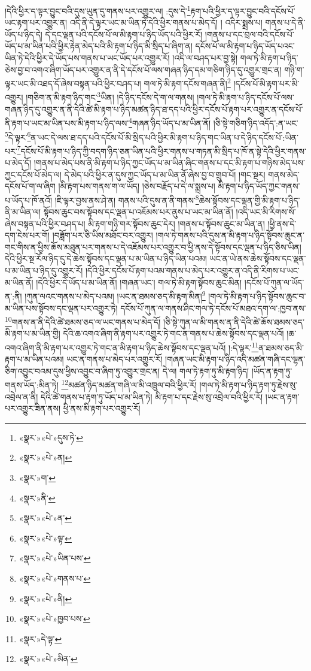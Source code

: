 །དེའི་ཕྱིར་ད་ལྟར་བྱུང་བའི་དུས་ཡུན་དུ་གནས་པར་འགྱུར་ལ། :དུས་དེ་\footnote{«སྣར་»«པེ་»དུས་ཏེ་}རྟག་པའི་ཕྱིར་ད་ལྟར་བྱུང་བའི་དངོས་པོ་ཡང་རྟག་པར་འགྱུར་ན། འདི་ནི་དེ་ལྟར་ཡང་མ་ཡིན་ཏེ་དེའི་ཕྱིར་གནས་པ་མེད་དོ། །
འདིར་སྨྲས་པ། གནས་པ་དེ་ནི་ཡོད་པ་ཉིད་དེ། དེ་དང་ལྡན་པའི་དངོས་པོ་ལ་མི་རྟག་པ་ཉིད་ཡོད་པའི་ཕྱིར་རོ། །གནས་པ་དང་བྲལ་བའི་དངོས་པོ་ཡོད་པ་མ་ཡིན་པའི་ཕྱིར་རྟེན་མེད་པའི་མི་རྟག་པ་ཉིད་མི་སྲིད་པ་ཞིག་ན། དངོས་པོ་ལ་མི་རྟག་པ་ཉིད་ཡོད་པའང་ཡིན་ཏེ་དེའི་ཕྱིར་དེ་ཡོད་པས་གནས་པ་ཡང་ཡོད་པར་འགྱུར་རོ། །འདི་ལ་བཤད་པར་བྱ་སྟེ། གལ་ཏེ་མི་རྟག་པ་ཉིད་ཅེས་བྱ་བ་འགའ་ཞིག་ཡོད་པར་འགྱུར་ན་ནི་དེ་དངོས་པོ་ལས་གཞན་ཉིད་དམ་གཅིག་ཉིད་དུ་འགྱུར་གྲང་ན། གཉི་ག་ལྟར་ཡང་མི་འཐད་དོ་ཞེས་བསྟན་པའི་ཕྱིར་བཤད་པ། གལ་ཏེ་མི་རྟག་དངོས་གཞན་ནི།\footnote{«སྣར་»«པེ་»ན།} །དངོས་པོ་མི་རྟག་པར་མི་འགྱུར། །གཅིག་ན་མི་རྟག་ཉིད་གང་\footnote{«སྣར་»ག་}ཡིན། །དེ་ཉིད་དངོས་དེ་ག་ལ་གནས། །གལ་ཏེ་མི་རྟག་པ་ཉིད་དངོས་པོ་ལས་གཞན་ཉིད་དུ་འགྱུར་ན་ནི་དེའི་ཚེ་མི་རྟག་པ་ཉིད་མཚན་ཉིད་ཐ་དད་པའི་ཕྱིར་དངོས་པོ་རྟག་པར་འགྱུར་ན་དངོས་པོ་ནི་རྟག་པ་ཡང་མ་ཡིན་པས་མི་རྟག་པ་ཉིད་ལས་\footnote{«སྣར་»ནི་}གཞན་ཉིད་ཡོད་པ་མ་ཡིན་ནོ། །ཅི་སྟེ་གཅིག་ཉིད་འདོད་:ན་ཡང་\footnote{«སྣར་»«པེ་»ན་}དེ་ལྟར་\footnote{«སྣར་»«པེ་»ལྟ་}ན་ཡང་དེ་ལས་ཐ་དད་པའི་དངོས་པོ་མི་སྲིད་པའི་ཕྱིར་མི་རྟག་པ་ཉིད་གང་ཡིན་པ་དེ་ཉིད་དངོས་པོ་:ཡིན་པར་\footnote{«སྣར་»«པེ་»ཡིན་པས་}དངོས་པོ་མི་རྟག་པ་ཉིད་ཀྱི་བདག་ཉིད་ཅན་ཡིན་པའི་ཕྱིར་གནས་པ་གཏན་མི་སྲིད་པ་ཁོ་ན་སྟེ་དེའི་ཕྱིར་གནས་པ་མེད་དོ། །གནས་པ་མེད་པས་ནི་མི་རྟག་པ་ཉིད་ཀྱང་ཡོད་པ་མ་ཡིན་ཞིང་གནས་པ་དང་མི་རྟག་པ་གཉིས་མེད་པས་ཀྱང་དངོས་པོ་མེད་ལ། དེ་མེད་པའི་ཕྱིར་ན་དུས་ཀྱང་ཡོད་པ་མ་ཡིན་ནོ་ཞེས་བྱ་བ་གྲུབ་པོ། །གང་སྔར། གནས་མེད་དངོས་པོ་ག་ལ་ཞིག །མི་རྟག་པས་གནས་ག་ལ་ཡོད། །ཅེས་བརྗོད་པ་དེ་ལ་སྨྲས་པ། མི་རྟག་པ་ཉིད་ཡོད་ཀྱང་གནས་པ་ཡོད་པ་ཁོ་ནའོ། །ཇི་ལྟར་བྱས་ནས་ཤེ་ན། གནས་པའི་དུས་ན་ནི་གནས་\footnote{«སྣར་»«པེ་»གནས་པ་}ཆེས་སྟོབས་དང་ལྡན་གྱི་མི་རྟག་པ་ཉིད་ནི་མ་ཡིན་ལ། སྟོབས་ཆུང་བས་སྟོབས་དང་ལྡན་པ་འཇོམས་པར་ནུས་པ་ཡང་མ་ཡིན་ནོ། །འདི་ཡང་མི་རིགས་སོ་ཞེས་བསྟན་པའི་ཕྱིར་བཤད་པ། མི་རྟག་གཉི་གར་སྟོབས་ཆུང་དེར། །གནས་པ་སྟོབས་ཆུང་མ་ཡིན་ན། །ཕྱི་ནས་དེ་དག་ངེས་པར་གོ། །བཟློག་པར་ཅི་ཡིས་མཐོང་བར་འགྱུར། །གལ་ཏེ་གནས་པའི་དུས་ན་མི་རྟག་པ་ཉིད་སྟོབས་ཆུང་ན་གང་གིས་ན་ཕྱིས་ཆོས་མཐུན་པར་གནས་པ་དེ་འཇོམས་པར་འགྱུར་བ་ཕྱི་ནས་དེ་སྟོབས་དང་ལྡན་པ་ཉིད་ཅིས་ཡིན། དེའི་ཕྱིར་སྔ་རོལ་ཉིད་དུ་དེ་ཆེས་སྟོབས་དང་ལྡན་པ་མ་ཡིན་པ་ཉིད་ཡིན་པའམ། ཡང་ན་ཡེ་ནས་ཆེས་སྟོབས་དང་ལྡན་པ་མ་ཡིན་པ་ཉིད་དུ་འགྱུར་རོ། །དེའི་ཕྱིར་དངོས་པོ་རྟག་པའམ་གནས་པ་མེད་པར་འགྱུར་ན་འདི་ནི་རིགས་པ་ཡང་མ་ཡིན་ནོ། །དེའི་ཕྱིར་དེ་ཡོད་པ་མ་ཡིན་ནོ། །གཞན་ཡང་། གལ་ཏེ་མི་རྟག་སྟོབས་ཆུང་མིན། །དངོས་པོ་ཀུན་ལ་ཡོད་ན་:ནི། །ཀུན་ལའང་གནས་པ་མེད་པའམ། །ཡང་ན་ཐམས་ཅད་མི་རྟག་མིན།\footnote{«སྣར་»«པེ་»ནི།} །གལ་ཏེ་མི་རྟག་པ་ཉིད་སྟོབས་ཆུང་བ་མ་ཡིན་པས་སྟོབས་དང་ལྡན་པར་འགྱུར་ཏེ། དངོས་པོ་ཀུན་ལ་གནས་ཤིང་གལ་ཏེ་དངོས་པོ་མཐའ་དག་ལ་:ཁྱབ་ནས་\footnote{«སྣར་»«པེ་»ཁྱབ་པས་}གནས་ན་ནི་དེའི་ཚེ་ཐམས་ཅད་ལ་ཡང་གནས་པ་མེད་དོ། །ཅི་སྟེ་ཀུན་ལ་མི་གནས་ན་ནི་དེའི་ཚེ་ཆོས་ཐམས་ཅད་མི་རྟག་པ་མ་ཡིན་གྱི། དེའི་ཆ་འགའ་ཞིག་ནི་རྟག་པར་འགྱུར་ཏེ་གང་ན་གནས་པ་ཆེས་སྟོབས་དང་ལྡན་པའོ། །ཆ་འགའ་ཞིག་ནི་མི་རྟག་པར་འགྱུར་ཏེ་གང་ན་མི་རྟག་པ་ཉིད་ཆེས་སྟོབས་དང་ལྡན་པའོ། །:དེ་ལྟར་\footnote{«སྣར་»དེ་ལྟ་}ན་ཐམས་ཅད་མི་རྟག་པ་མ་ཡིན་པའམ། ཡང་ན་གནས་པ་མེད་པར་འགྱུར་རོ། །གཞན་ཡང་མི་རྟག་པ་ཉིད་འདི་མཚན་གཞི་དང་ལྷན་ཅིག་འབྱུང་བའམ་དུས་ཕྱིས་འབྱུང་བ་ཞིག་ཏུ་འགྱུར་གྲང་ན། དེ་ལ། གལ་ཏེ་རྟག་ཏུ་མི་རྟག་ཉིད། །ཡོད་ན་རྟག་ཏུ་གནས་ཡོད་:མིན་ཏེ། \footnote{«སྣར་»«པེ་»མིན་}མཚན་ཉིད་མཚན་གཞི་ལ་མི་འཁྲུལ་བའི་ཕྱིར་རོ། །གལ་ཏེ་མི་རྟག་པ་ཉིད་རྟག་ཏུ་རྗེས་སུ་འབྲེལ་ན་ནི། དེའི་ཚེ་གནས་པ་རྟག་ཏུ་ཡོད་པ་མ་ཡིན་ཏེ། མི་རྟག་པ་དང་རྗེས་སུ་འབྲེལ་བའི་ཕྱིར་རོ། །ཡང་ན་རྟག་པར་འགྱུར་ཟིན་ནས། ཕྱི་ནས་མི་རྟག་པར་འགྱུར་རོ། 